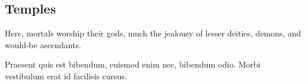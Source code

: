\subsection{Temples}

Here, mortals worship their gods, much the jealousy of lesser deities, demons, and would-be ascendants.

\begin{quotebox}
Praesent quis est bibendum, euismod enim nec, bibendum odio. Morbi vestibulum erat id facilisis cursus.
\end{quotebox}
